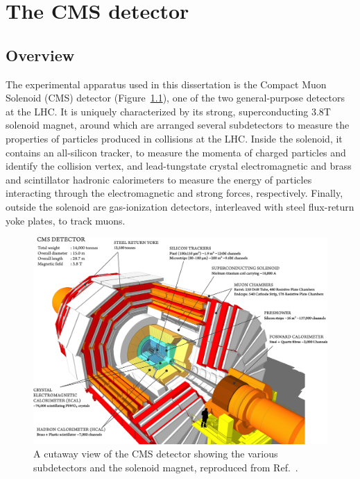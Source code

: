 \chapter{The CMS detector}
\label{sec:02_cms}

\section{Overview}

The experimental apparatus used in this dissertation is the Compact Muon Solenoid (CMS) detector (Figure~\ref{fig:02_cms_detector}), one of the two general-purpose detectors at the LHC.
It is uniquely characterized by its strong, superconducting 3.8\unit{T} solenoid magnet, around which are arranged several subdetectors to measure the properties of particles produced in collisions at the LHC.
Inside the solenoid, it contains an all-silicon tracker, to measure the momenta of charged particles and identify the collision vertex, and lead-tungstate crystal electromagnetic and brass and scintillator hadronic calorimeters to measure the energy of particles interacting through the electromagnetic and strong forces, respectively.
Finally, outside the solenoid are gas-ionization detectors, interleaved with steel flux-return yoke plates, to track muons.

\begin{figure}[ht]
    \centering
    \includegraphics[width=\textwidth]{figures/02-CMS/cms/cms_schematic.png}
    \caption{A cutaway view of the CMS detector showing the various subdetectors and the solenoid magnet, reproduced from Ref.~\cite{CMS:2023gfb}.}
    \label{fig:02_cms_detector}
\end{figure}

